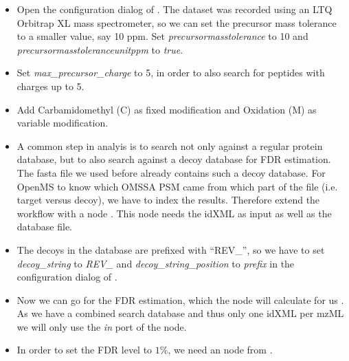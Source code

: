 \begin{itemize}
\item
Open the configuration dialog of .
The dataset was recorded using an LTQ Orbitrap XL mass spectrometer, so we can set the precursor mass tolerance to a smaller value, say 10 ppm.
Set \textit{precursor\textunderscore mass\textunderscore tolerance} to 10 and \\ \textit{precursor\textunderscore mass\textunderscore tolerance\textunderscore unit\textunderscore ppm} to \textit{true}.
\item
Set \textit{max\_precursor\_charge} to 5, in order to also search for peptides with charges up to 5.
\item
Add Carbamidomethyl (C) as fixed modification and Oxidation (M) as variable modification.
\item
A common step in analyis is to search not only against a regular protein database, but to also search against a decoy database for FDR estimation.
The fasta file we used before already contains such a decoy database.
For OpenMS to know which OMSSA PSM came from which part of the file (i.e. target versus decoy), we have to index the results.
Therefore extend the workflow with a  node .
This node needs the idXML as input as well as the database file.
\item
The decoys in the database are prefixed with ``REV\_'', so we have to set \textit{decoy\_string} to \textit{REV\_} and \textit{decoy\_string\_position} to \textit{prefix} in the configuration dialog of .
\item
Now we can go for the FDR estimation, which the  node will calculate for us .
As we have a combined search database and thus only one idXML per mzML we will only use the \textit{in} port of the  node.
\item
In order to set the FDR level to $1\%$, we need an  node from .

\end{itemize}
